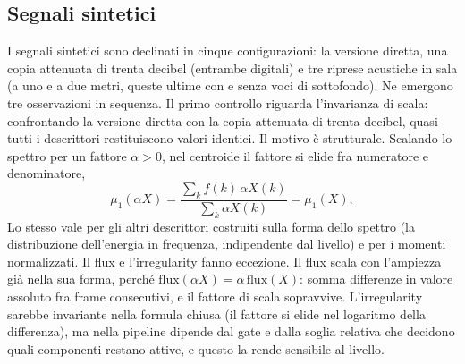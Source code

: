 \documentclass{article}
\begin{document}
\subsection{Segnali sintetici}\label{sec:sintetici}
I segnali sintetici sono declinati in cinque configurazioni: la versione diretta, una copia attenuata di trenta decibel (entrambe digitali) e tre riprese acustiche in sala (a uno e a due metri, queste ultime con e senza voci di sottofondo). Ne emergono tre osservazioni in sequenza. Il primo controllo riguarda l'invarianza di scala: confrontando la versione diretta con la copia attenuata di trenta decibel, quasi tutti i descrittori restituiscono valori identici. Il motivo è strutturale. Scalando lo spettro per un fattore $\alpha>0$, nel centroide il fattore si elide fra numeratore e denominatore,
\begin{equation*}
  \mu_1(\alpha X)=\frac{\sum_k f(k)\,\alpha X(k)}{\sum_k \alpha X(k)}=\mu_1(X),
\end{equation*}
 Lo stesso vale per gli altri descrittori costruiti sulla forma dello spettro (la distribuzione dell'energia in frequenza, indipendente dal livello) e per i momenti normalizzati. Il flux e l'irregularity fanno eccezione. Il flux scala con l'ampiezza già nella sua forma, perché $\text{flux}(\alpha X)=\alpha\,\text{flux}(X)$: somma differenze in valore assoluto fra frame consecutivi, e il fattore di scala sopravvive. L'irregularity sarebbe invariante nella formula chiusa (il fattore si elide nel logaritmo della differenza), ma nella pipeline dipende dal gate e dalla soglia relativa che decidono quali componenti restano attive, e questo la rende sensibile al livello. %
\end{document}
